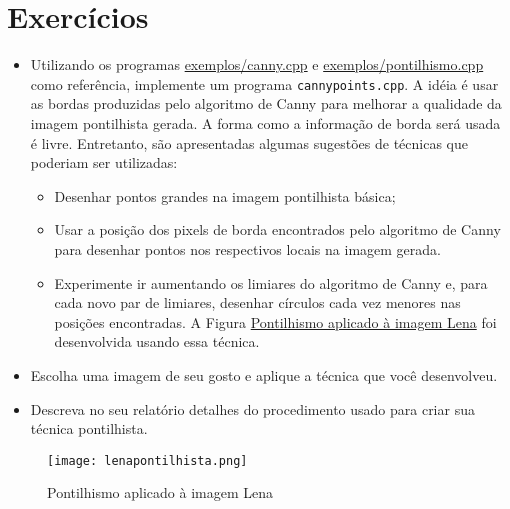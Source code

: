 \documentclass[11pt]{amsbook}
\begin{document}
\hypertarget{x-exercícios}{\section{Exercícios}}
\begin{itemize}

\item Utilizando os programas \href{exemplos/canny.cpp}{exemplos/canny.cpp} e
\href{exemplos/pontilhismo.cpp}{exemplos/pontilhismo.cpp} como referência, implemente um
programa \texttt{cannypoints.cpp}. A idéia é usar as bordas produzidas pelo
algoritmo de Canny para melhorar a qualidade da imagem pontilhista
gerada. A forma como a informação de borda será usada é
livre. Entretanto, são apresentadas algumas sugestões de técnicas
que poderiam ser utilizadas:

\begin{itemize}

\item Desenhar pontos grandes na imagem pontilhista básica;

\item Usar a posição dos pixels de borda encontrados pelo algoritmo de
Canny para desenhar pontos nos respectivos locais na imagem gerada.

\item Experimente ir aumentando os limiares do algoritmo de Canny e, para
cada novo par de limiares, desenhar círculos cada vez menores nas
posições encontradas. A Figura \hyperlink{fig-lenapontilhista}{Pontilhismo aplicado à imagem Lena} foi
desenvolvida usando essa técnica.

\end{itemize}

\item Escolha uma imagem de seu gosto e aplique a técnica que você
desenvolveu.

\item Descreva no seu relatório detalhes do procedimento usado para criar
sua técnica pontilhista.

\end{itemize}


\begin{figure}[h]{}
\centering\texttt{[image: lenapontilhista.png]}
\caption{Pontilhismo aplicado à imagem Lena}

\end{figure}
\end{document}
